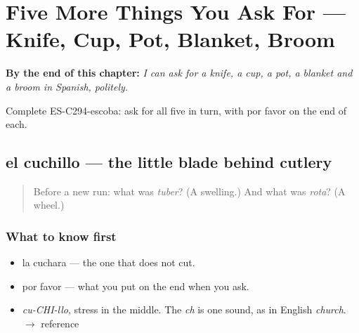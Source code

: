 
\chapter{Five More Things You Ask For --- Knife, Cup, Pot, Blanket, Broom}
\label{ch:cinco-cosas-mas}

\begin{chapteropening}
\textbf{By the end of this chapter:} \emph{I can ask for a knife, a cup, a pot, a blanket and a broom in Spanish, politely.}

Complete ES-C294-escoba: ask for all five in turn, with por favor on the end of each.
\end{chapteropening}

\section[el cuchillo]{el cuchillo — the little blade behind cutlery}

\label{lesson:ES-C294-cuchillo}



\begin{quote}
Before a new run: what was \emph{tuber}? (A swelling.) And what was \emph{rota}? (A wheel.)
\end{quote}

\subsection*{What to know first}
\begin{itemize}
\raggedright
  \item la cuchara — the one that does not cut.
  \item por favor — what you put on the end when you ask.
\end{itemize}

\begin{sounds}
\begin{itemize}
\raggedright
  \item \emph{cu-CHI-llo}, stress in the middle. The \emph{ch} is one sound, as in English \emph{church}. $\to$ reference
\end{itemize}
\end{sounds}

